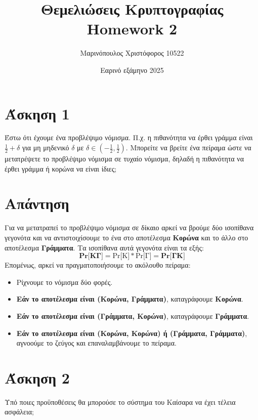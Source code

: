 \documentclass[12pt]{article}
\title{\vspace{-2cm} Θεμελιώσεις Κρυπτογραφίας \\
        Homework 2}
\author{Μαρινόπουλος Χριστόφορος 10522}
\date{Εαρινό εξάμηνο 2025}
\begin{document}
\maketitle
\section*{Άσκηση 1}

Έστω ότι έχουμε ένα προβλέψιμο νόμισμα. Π.χ. η πιθανότητα να έρθει γράμμα είναι \( \frac{1}{2} + \delta \) για μη μηδενικό \(\delta\) με \(\delta \in \left( -\frac{1}{2}, \frac{1}{2} \right)\).
Μπορείτε να βρείτε ένα πείραμα ώστε να μετατρέψετε το προβλέψιμο νόμισμα σε τυχαίο νόμισμα, δηλαδή η πιθανότητα να έρθει γράμμα ή κορώνα να είναι ίδιες;
\section*{Απάντηση}
Για να μετατραπεί το προβλέψιμο νόμισμα σε δίκαιο αρκεί να βρούμε δύο ισοπίθανα γεγονότα και να αντιστοιχίσουμε το ένα στο αποτέλεσμα \textbf{Κορώνα} και το άλλο στο αποτέλεσμα \textbf{Γράμματα}. Τα ισοπίθανα αυτά γεγονότα είναι τα εξής:
\[
\textbf{Pr[ΚΓ]} = \text{Pr[K]} * \text{Pr[Γ]} = \textbf{Pr[ΓΚ]}
\]
Επομένως, αρκεί να πραγματοποιήσουμε το ακόλουθο πείραμα:
\begin{itemize}
    \item Ρίχνουμε το νόμισμα δύο φορές.
    \item \textbf{Εάν το αποτέλεσμα είναι (Κορώνα, Γράμματα)}, καταγράφουμε \textbf{Κορώνα}.
    \item \textbf{Εάν το αποτέλεσμα είναι (Γράμματα, Κορώνα)}, καταγράφουμε \textbf{Γράμματα}.
    \item \textbf{Εάν το αποτέλεσμα είναι (Κορώνα, Κορώνα) ή (Γράμματα, Γράμματα)}, αγνοούμε το ζεύγος και επαναλαμβάνουμε το πείραμα.
\end{itemize}
\hfill \blacksquare
\section*{Άσκηση 2}
Υπό ποιες προϋποθέσεις θα μπορούσε το σύστημα του Καίσαρα να έχει
τέλεια ασφάλεια;
\end{document}
